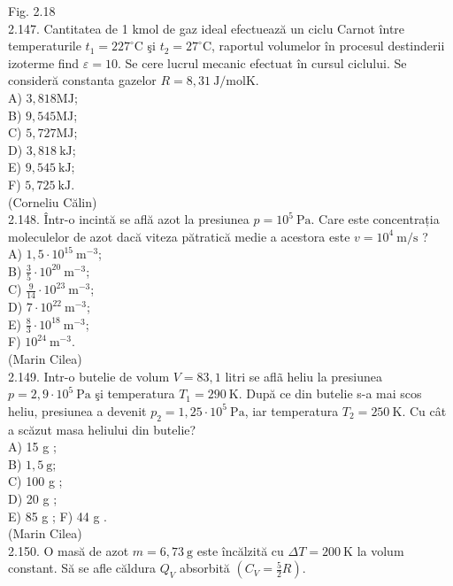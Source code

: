 \documentclass[10pt]{article}
\begin{document}
Fig. 2.18\\
2.147. Cantitatea de 1 kmol de gaz ideal efectuează un ciclu Carnot între temperaturile $t_{1}=227^{\circ} \mathrm{C}$ şi $t_{2}=27^{\circ} \mathrm{C}$, raportul volumelor în procesul destinderii izoterme find $\varepsilon=10$. Se cere lucrul mecanic efectuat în cursul ciclului. Se consideră constanta gazelor $R=8,31 \mathrm{~J} / \mathrm{mol} \mathrm{K}$.\\
A) $3,818 \mathrm{MJ}$;\\
B) $9,545 \mathrm{MJ}$;\\
C) $5,727 \mathrm{MJ}$;\\
D) $3,818 \mathrm{~kJ}$;\\
E) $9,545 \mathrm{~kJ}$;\\
F) $5,725 \mathrm{~kJ}$.\\
(Corneliu Călin)\\
2.148. Într-o incintă se află azot la presiunea $p=10^{5} \mathrm{~Pa}$. Care este concentrația moleculelor de azot dacă viteza pătratică medie a acestora este $v=10^{4} \mathrm{~m} / \mathrm{s}$ ?\\
A) $1,5 \cdot 10^{15} \mathrm{~m}^{-3}$;\\
B) $\frac{3}{5} \cdot 10^{20} \mathrm{~m}^{-3}$;\\
C) $\frac{9}{14} \cdot 10^{23} \mathrm{~m}^{-3}$;\\
D) $7 \cdot 10^{22} \mathrm{~m}^{-3}$;\\
E) $\frac{8}{3} \cdot 10^{18} \mathrm{~m}^{-3}$;\\
F) $10^{24} \mathrm{~m}^{-3}$.\\
(Marin Cilea)\\
2.149. Intr-o butelie de volum $V=83,1$ litri se aflã heliu la presiunea $p=2,9 \cdot 10^{5} \mathrm{~Pa}$ şi temperatura $T_{1}=290 \mathrm{~K}$. După ce din butelie s-a mai scos heliu, presiunea a devenit $p_{2}=1,25 \cdot 10^{5} \mathrm{~Pa}$, iar temperatura $T_{2}=250 \mathrm{~K}$. Cu cât a scăzut masa heliului din butelie?\\
A) 15 g ;\\
B) $1,5 \mathrm{~g}$;\\
C) 100 g ;\\
D) 20 g ;\\
E) 85 g ; F) 44 g .\\
(Marin Cilea)\\
2.150. O masă de azot $m=6,73 \mathrm{~g}$ este încălzită cu $\Delta T=200 \mathrm{~K}$ la volum constant. Să se afle căldura $Q_{V}$ absorbită $\left(C_{V}=\frac{5}{2} R\right)$.\\
\end{document}
